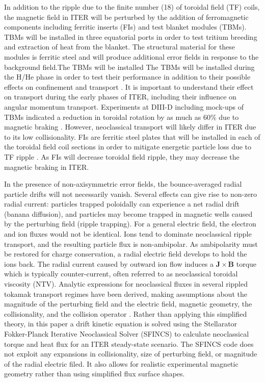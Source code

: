 \documentclass{article}
\numberwithin{figure}{section}
\numberwithin{equation}{section}
\begin{document}
In addition to the ripple due to the finite number (18) of toroidal field (TF) coils, the magnetic field in ITER will be perturbed by the addition of ferromagnetic components including ferritic inserts (FIs) and test blanket modules (TBMs). TBMs will be installed in three equatorial ports in order to test tritium breeding and extraction of heat from the blanket. The structural material for these modules is ferritic steel and will produce additional error fields in response to the background field.The TBMs will be installed 
 The TBMs will be installed during the H/He phase in order to test their performance in addition to their possible effects on confinement and transport \cite{Chuyanov2010}. It is important to understand their effect on transport during the early phases of ITER, including their influence on angular momentum transport. Experiments at DIII-D including mock-ups of TBMs indicated a reduction in toroidal rotation by as much as 60\% due to magnetic braking \cite{Schaffer2011}. However, neoclassical transport will likely differ in ITER due to its low collisionality. FIs are ferritic steel plates that will be installed in each of the toroidal field coil sections in order to mitigate energetic particle loss due to TF ripple \cite{Tobita2003}. As FIs will decrease toroidal field ripple, they may decrease the magnetic braking in ITER. 

In the presence of non-axisymmetric error fields, the bounce-averaged radial particle drifts will not necessarily vanish. Several effects can give rise to non-zero radial current: particles trapped poloidally can experience a net radial drift (banana diffusion), and particles may become trapped in magnetic wells caused by the perturbing field (ripple trapping). For a general electric field, the electron and ion fluxes would not be identical. Ions tend to dominate neoclassical ripple transport, and the resulting particle flux is non-ambipolar. As ambipolarity must be restored for charge conservation, a radial electric field develops to hold the ions back. The radial current caused by outward ion flow induces a $\bm{J} \times \bm{B}$ torque which is typically counter-current, often referred to as neoclassical toroidal viscosity (NTV). Analytic expressions for neoclassical fluxes in several rippled tokamak transport regimes have been derived, making assumptions about the magnitude of the perturbing field and the electric field, magnetic geometry, the collisionality, and the collision operator \cite{Shaing2003, Shaing2008, Shaing2010}. Rather than applying this simplified theory, in this paper a drift kinetic equation is solved using the Stellarator Fokker-Planck Iterative Neoclassical Solver (SFINCS) \cite{Landreman2014} to calculate neoclassical torque and heat flux for an ITER steady-state scenario. The SFINCS code does not exploit any expansions in collisionality, size of perturbing field, or magnitude of the radial electric filed. It also allows for realistic experimental magnetic geometry rather than using simplified flux surface shapes. 
\end{document}
